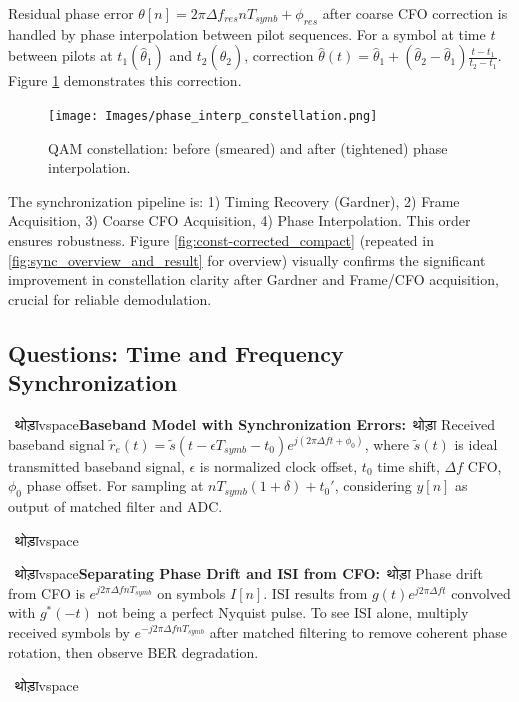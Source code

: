 \documentclass[11pt]{article}
\newenvironment{projectquestion}[1]
{\par\ थोड़ाvspace{\topsep}\noindent\textbf{#1}\ थोड़ा\quad\ignorespaces}
{\par\ थोड़ाvspace{\topsep}}
\begin{document}
			Residual phase error $\theta[n] = 2\pi \Delta f_{res} n T_{symb} + \phi_{res}$ after coarse CFO correction is handled by phase interpolation between pilot sequences. For a symbol at time $t$ between pilots at $t_1 (\hat{\theta}_1)$ and $t_2 (\hat{\theta}_2)$, correction $\hat{\theta}(t) = \hat{\theta}_1 + (\hat{\theta}_2 - \hat{\theta}_1) \frac{t - t_1}{t_2 - t_1}$. Figure \ref{fig:phase_interp_constellation_style_change_compact} demonstrates this correction.
			
			\begin{figure}[H]
				\centering
				\texttt{[image: Images/phase\_interp\_constellation.png]} 
				\caption{QAM constellation: before (smeared) and after (tightened) phase interpolation.}
				\label{fig:phase_interp_constellation_style_change_compact}
			\end{figure}
			
			The synchronization pipeline is: 1) Timing Recovery (Gardner), 2) Frame Acquisition, 3) Coarse CFO Acquisition, 4) Phase Interpolation. This order ensures robustness. Figure \ref{fig:const-corrected_compact} (repeated in \ref{fig:sync_overview_and_result} for overview) visually confirms the significant improvement in constellation clarity after Gardner and Frame/CFO acquisition, crucial for reliable demodulation.
			
			\subsection*{Questions: Time and Frequency Synchronization}
			\begin{projectquestion}{Baseband Model with Synchronization Errors:}
				Received baseband signal $\tilde{r}_e(t) = \tilde{s}(t-\epsilon T_{symb} - t_0) e^{j(2\pi\Delta f t + \phi_0)}$, where $\tilde{s}(t)$ is ideal transmitted baseband signal, $\epsilon$ is normalized clock offset, $t_0$ time shift, $\Delta f$ CFO, $\phi_0$ phase offset. For sampling at $nT_{symb}(1+\delta)+t_0'$, considering $y[n]$ as output of matched filter and ADC.
			\end{projectquestion}
			
			\begin{projectquestion}{Separating Phase Drift and ISI from CFO:}
				Phase drift from CFO is $e^{j2\pi \Delta f nT_{symb}}$ on symbols $I[n]$. ISI results from $g(t)e^{j2\pi\Delta ft}$ convolved with $g^*(-t)$ not being a perfect Nyquist pulse. To see ISI alone, multiply received symbols by $e^{-j2\pi \Delta f nT_{symb}}$ after matched filtering to remove coherent phase rotation, then observe BER degradation.
			\end{projectquestion}
			
\end{document}
